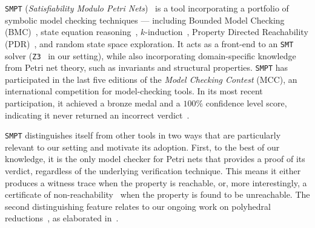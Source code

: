 \texttt{SMPT} (\emph{Satisfiability Modulo Petri Nets})~\cite{AmDa23} is a tool incorporating a portfolio of symbolic model checking techniques --- including Bounded Model Checking (BMC)~\cite{BiCiClZh99}, state equation reasoning~\cite{Mu77}, $k$-induction~\cite{ShSiSt20}, Property Directed Reachability (PDR)~\cite{Br11,AmDaHu22}, and random state space exploration. It acts as a front-end to an \texttt{SMT} solver (\texttt{Z3}~\cite{DeBj08} in our setting), while also incorporating domain-specific knowledge from Petri net theory, such as invariants and structural properties. \texttt{SMPT} has participated in the last five editions of the \textit{Model Checking Contest} (MCC), an international competition for model-checking tools. In its most recent participation, it achieved a bronze medal and a $100\%$ confidence level score, indicating it never returned an incorrect verdict~\cite{mcc:2025}.

\medskip
\texttt{SMPT} distinguishes itself from other tools in two ways that are particularly relevant to our setting and motivate its adoption. First, to the best of our knowledge, it is the only model checker for Petri nets that provides a proof of its verdict, regardless of the underlying verification technique. This means it either produces a witness trace when the property is reachable, or, more interestingly, a certificate of non-reachability~\cite{AmDaHu22} when the property is found to be unreachable.
%
The second distinguishing feature relates to our ongoing work on polyhedral reductions~\cite{AmBeDa21}, as elaborated in~.



